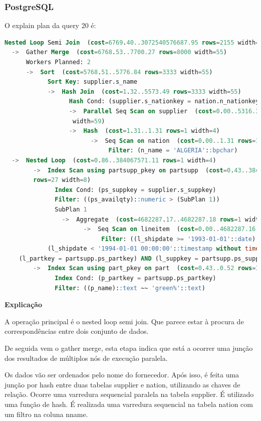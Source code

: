 \documentclass{article}
\begin{document}
\subsubsection{PostgreSQL}
O explain plan da query 20 é:\\
\begin{lstlisting}[language=SQL]
Nested Loop Semi Join  (cost=6769.40..3072540576687.95 rows=2155 width=51)
  ->  Gather Merge  (cost=6768.53..7700.27 rows=8000 width=55)
      Workers Planned: 2
      ->  Sort  (cost=5768.51..5776.84 rows=3333 width=55)
            Sort Key: supplier.s_name
            ->  Hash Join  (cost=1.32..5573.49 rows=3333 width=55)
                  Hash Cond: (supplier.s_nationkey = nation.n_nationkey)
                  ->  Parallel Seq Scan on supplier  (cost=0.00..5316.33 rows=83333
                   width=59)
                  ->  Hash  (cost=1.31..1.31 rows=1 width=4)
                        ->  Seq Scan on nation  (cost=0.00..1.31 rows=1 width=4)
                             Filter: (n_name = 'ALGERIA'::bpchar)
  ->  Nested Loop  (cost=0.86..384067571.11 rows=1 width=4)
        ->  Index Scan using partsupp_pkey on partsupp  (cost=0.43..384067557.06 
        rows=27 width=8)
              Index Cond: (ps_suppkey = supplier.s_suppkey)
              Filter: ((ps_availqty)::numeric > (SubPlan 1))
              SubPlan 1
                ->  Aggregate  (cost=4682287.17..4682287.18 rows=1 width=32)
                      ->  Seq Scan on lineitem  (cost=0.00..4682287.16 rows=1 width=5)
                           Filter: ((l_shipdate >= '1993-01-01'::date) AND 
            (l_shipdate < '1994-01-01 00:00:00'::timestamp without time zone) AND 
    (l_partkey = partsupp.ps_partkey) AND (l_suppkey = partsupp.ps_suppkey))
        ->  Index Scan using part_pkey on part  (cost=0.43..0.52 rows=1 width=4)
              Index Cond: (p_partkey = partsupp.ps_partkey)
              Filter: ((p_name)::text ~~ 'green%'::text)
  \end{lstlisting}

  \textbf{Explicação}

  \texttt{}\par A operação principal é o nested loop semi join. Que parece estar à procura de correspondências entre dois conjunto de dados.

  De seguida vem o gather merge, esta etapa indica que está a ocorrer uma junção dos resultados de múltiplos nós de execução paralela.

  Os dados vão ser ordenados pelo nome do fornecedor. Após isso, é feita uma junção por hash entre duas tabelas supplier e nation, utilizando as chaves de relação. Ocorre uma varredura sequencial paralela na tabela supplier. É utilizado uma função de hash. É realizada uma varredura sequencial na tabela nation com um filtro na coluna n\underline{}name.
\end{document}
